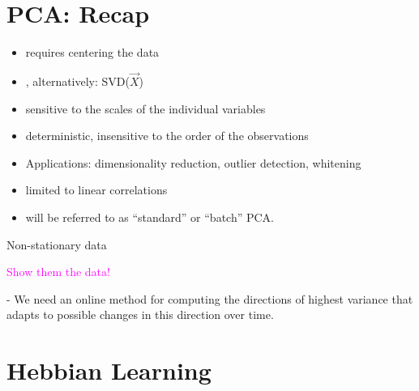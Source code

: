 
\section{PCA: Recap}

\begin{frame}{\secname}

\begin{itemize}
\item requires centering the data
\item {}, alternatively: SVD($\vec X$)
\item sensitive to the scales of the individual variables
\item deterministic, insensitive to the order of the observations
\item Applications: dimensionality reduction, outlier detection, whitening
\item limited to linear correlations
\item will be referred to as ``standard'' or ``batch'' PCA.
\end{itemize}

\end{frame}

\begin{frame}{Non-stationary data}


\textcolor{magenta}{Show them the data!}

\pause

\svspace{35mm}


\pause

- We need an online method for computing the directions of highest variance that adapts to possible changes in this direction over time.

\end{frame}

\section{Hebbian Learning}


